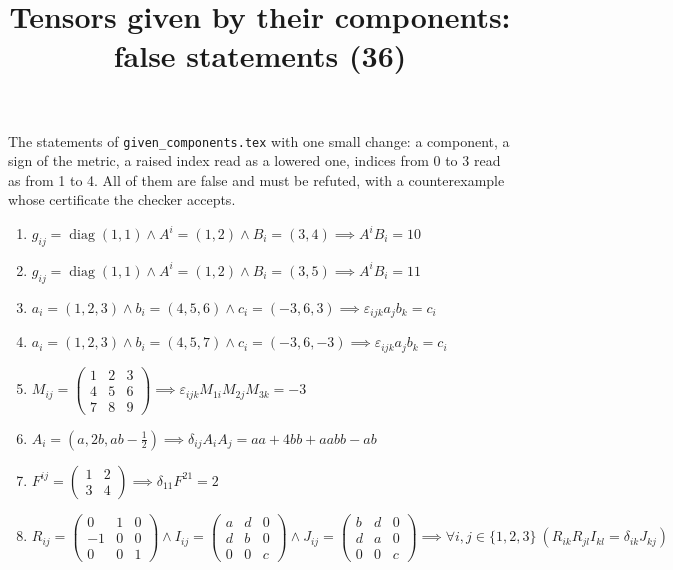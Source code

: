 \documentclass[11pt,a4paper]{article}
\title{Tensors given by their components: false statements (36)}
\author{}
\date{}
\begin{document}
\maketitle
The statements of \texttt{given\_components.tex} with one small change: a component, a sign of the metric, a raised index read as a lowered one, indices from 0 to 3 read as from 1 to 4. All of them are false and must be refuted, with a counterexample whose certificate the checker accepts.

\begin{enumerate}
\item $\displaystyle g_{ij} = \operatorname{diag}(1, 1) \land A^{i} = (1, 2) \land B_{i} = (3, 4) \implies A^{i} B_{i} = 10$
\item $\displaystyle g_{ij} = \operatorname{diag}(1, 1) \land A^{i} = (1, 2) \land B_{i} = (3, 5) \implies A^{i} B_{i} = 11$
\item $\displaystyle a_{i} = (1, 2, 3) \land b_{i} = (4, 5, 6) \land c_{i} = (-3, 6, 3) \implies \varepsilon_{ijk} a_{j} b_{k} = c_{i}$
\item $\displaystyle a_{i} = (1, 2, 3) \land b_{i} = (4, 5, 7) \land c_{i} = (-3, 6, -3) \implies \varepsilon_{ijk} a_{j} b_{k} = c_{i}$
\item $\displaystyle M_{ij} = \begin{pmatrix} 1 & 2 & 3 \\ 4 & 5 & 6 \\ 7 & 8 & 9 \end{pmatrix} \implies \varepsilon_{ijk} M_{1i} M_{2j} M_{3k} = -3$
\item $\displaystyle A_{i} = (a, 2 b, a b - \frac{1}{2}) \implies \delta_{ij} A_{i} A_{j} = a a + 4 b b + a a b b - a b$
\item $\displaystyle F^{ij} = \begin{pmatrix} 1 & 2 \\ 3 & 4 \end{pmatrix} \implies \delta_{11} F^{21} = 2$
\item $\displaystyle R_{ij} = \begin{pmatrix} 0 & 1 & 0 \\ -1 & 0 & 0 \\ 0 & 0 & 1 \end{pmatrix} \land I_{ij} = \begin{pmatrix} a & d & 0 \\ d & b & 0 \\ 0 & 0 & c \end{pmatrix} \land J_{ij} = \begin{pmatrix} b & d & 0 \\ d & a & 0 \\ 0 & 0 & c \end{pmatrix} \implies \forall i, j \in \{1, 2, 3\}\ \left( R_{ik} R_{jl} I_{kl} = \delta_{ik} J_{kj} \right)$

\end{enumerate}
\end{document}
